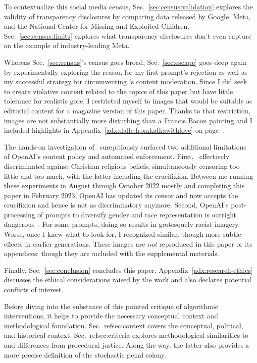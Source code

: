 To contextualize this social media census, Sec.\ \ref{sec:census:validation}
explores the validity of transparency disclosures by comparing data released by
Google, Meta, and the National Center for Missing and Exploited Children.
Sec.~\ref{sec:census:limits} explores what transparency disclosures don't even
capture on the example of industry-leading Meta.

Whereas Sec.~\ref{sec:census}'s census goes broad, Sec.~\ref{sec:escape} goes
deep again by experimentally exploring the reason for my first prompt's
rejection as well as my successful strategy for circumventing \DALLE's content
moderation. Since I did seek to create violative content related to the topics
of this paper but have little tolerance for realistic gore, I restricted myself
to images that would be suitable as editorial content for a magazine version of
this paper. Thanks to that restriction, images are not substantially more
disturbing than a Francis Bacon painting and I included highlights in
Appendix~\ref{adx:dalle:fromkafkawithlove} on
page~\pageref{adx:dalle:fromkafkawithlove}.

The hands-on investigation of \DALLE\ surepitiously surfaced two additional
limitations of OpenAI's content policy and automated enforcement. First, \DALLE\
effectively discriminated against Christian religious beliefs, simultaneously
censoring too little and too much, with the latter including the crucifixion.
Between me running these experiments in August through October 2022 mostly and
completing this paper in February 2023, OpenAI has updated its censor and now
accepts the crucifixion and hence is not as discriminatory anymore. Second,
OpenAI's post-processing of prompts to diversify gender and race representation
is outright dangerous~\cite{OpenAI2022e,Sparkes2022}. For some prompts, doing so
results in grotesquely racist imagery. Worse, once I knew what to look for, I
recognized similar, though more subtle effects in earlier generations. These
images are \emph{not} reproduced in this paper or its appendices; though they
are included with the supplemental materials.

Finally, Sec.\ \ref{sec:conclusion} concludes this paper.
Appendix~\ref{adx:research-ethics} discusses the ethical considerations raised
by the work and also declares potential conflicts of interest.

Before diving into the substance of this pointed critique of algorithmic
interventions, it helps to provide the necessary conceptual context and
methodological foundation. Sec.\ ref{sec:context} covers the conceptual,
political, and historical context. Sec.\ ref{sec:criteria} explores
methodological similarities to and differences from procedural justice. Along
the way, the latter also provides a more precise definition of the stochastic
penal colony.



